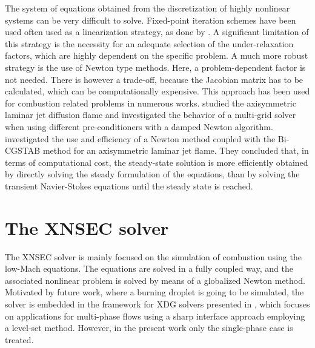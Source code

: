 The system of equations obtained from the discretization of highly nonlinear systems  can be very difficult to solve. Fixed-point iteration schemes have been used often used as a linearization strategy, as done by \textcite{kleinHighorderDiscontinuousGalerkin2016}. A significant limitation of this strategy is the necessity for an adequate selection of the under-relaxation factors, which are highly dependent on the specific problem. A much more robust strategy is the use of Newton type methods. Here, a problem-dependent factor is not needed. There is however a trade-off, because the Jacobian matrix has to be calculated, which can be computationally expensive. This approach has been used for combustion related problems in numerous works. \textcite{karaaPreconditionedMultigridSimulation2003} studied the axisymmetric laminar jet diffusion flame and investigated the behavior of a multi-grid solver when using different pre-conditioners with a damped Newton algorithm. \textcite{shenNewtonMethodSteady2006a} investigated the use  and efficiency of a Newton method coupled with the Bi-CGSTAB method for an axisymmetric laminar jet flame. They concluded that, in terms of computational cost, the steady-state solution is more efficiently obtained by directly solving the steady formulation of the equations, than by solving the transient Navier-Stokes equations until the steady state is reached.

\section{The XNSEC solver} \label{sec:XNSECSolver}
The XNSEC solver is mainly focused on the simulation of combustion using the low-Mach equations. The equations are solved in a fully coupled way, and the associated nonlinear problem is solved by means of a globalized Newton method. Motivated by future work, where a burning droplet is going to be simulated, the solver is embedded in the framework for \gls{XDG} solvers presented in \textcite{kummerExtendedDiscontinuousGalerkin2017}, which focuses on applications for multi-phase flows using a sharp interface approach employing a level-set method. However, in the present work only the single-phase case is treated. 
 
